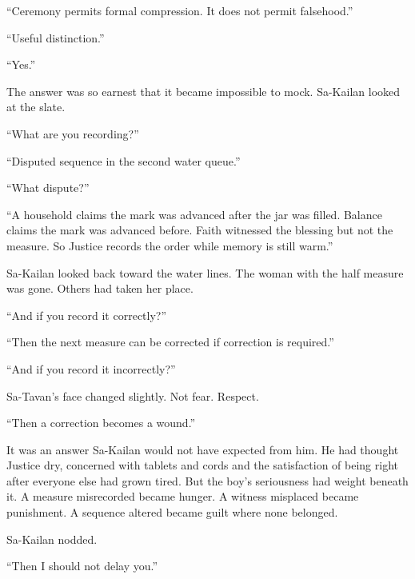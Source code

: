 “Ceremony permits formal compression.
It does not permit falsehood.”\par

“Useful distinction.”\par

“Yes.”\par

The answer was so earnest that it became impossible to mock.
Sa-Kailan looked at the slate.\par

“What are you recording?”\par

“Disputed sequence in the second water queue.”\par

“What dispute?”\par

“A household claims the mark was advanced after the jar was filled.
Balance claims the mark was advanced before.
Faith witnessed the blessing but not the measure.
So Justice records the order while memory is still warm.”\par

Sa-Kailan looked back toward the water lines.
The woman with the half measure was gone.
Others had taken her place.\par

“And if you record it correctly?”\par

“Then the next measure can be corrected if correction is required.”\par

“And if you record it incorrectly?”\par

Sa-Tavan’s face changed slightly.
Not fear.
Respect.\par

“Then a correction becomes a wound.”\par

It was an answer Sa-Kailan would not have expected from him.
He had thought Justice dry, concerned with tablets and cords and the satisfaction of being right after everyone else had grown tired.
But the boy’s seriousness had weight beneath it.
A measure misrecorded became hunger.
A witness misplaced became punishment.
A sequence altered became guilt where none belonged.\par

Sa-Kailan nodded.\par

“Then I should not delay you.”\par


